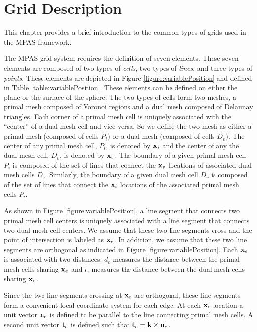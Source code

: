 \chapter{Grid Description}

This chapter provides a brief introduction to the common types of grids used in the MPAS framework. 

The MPAS grid system requires the definition of seven elements. These seven elements are composed of two types of {\it cells}, two types of {\it lines}, and three types of {\it points}. These elements are depicted in Figure \ref{figure:variablePosition} and defined in Table \ref{table:variablePosition}.  These elements can be defined on either the plane or the surface of the sphere. The two types of cells form two meshes, a primal mesh composed of Voronoi regions and a dual mesh composed of Delaunay triangles. Each corner of a primal mesh cell is uniquely associated with the ``center'' of a dual mesh cell and vice versa. So we define the two mesh as either a primal mesh (composed of cells $P_i$) or a dual mesh (composed of cells $D_v$). The center of any primal mesh cell, $P_i$, is denoted by ${\bf x}_i$ and the center of any the dual mesh cell, $D_v$, is denoted by ${\bf x}_v$. The boundary of a given primal mesh cell $P_i$ is composed of the set of lines that connect the ${\bf x}_v$ locations of associated dual mesh cells $D_v$. Similarly, the boundary of a given dual mesh cell $D_v$ is composed of the set of lines that connect the ${\bf x}_i$ locations of the associated primal mesh cells $P_i$. 

As shown in Figure \ref{figure:variablePosition}, a line segment that connects two primal mesh cell centers is uniquely associated with a line segment that connects two dual mesh cell centers. We assume that these two line segments cross and the point of intersection is labeled as ${\bf x}_e$. In addition, we assume that these two line segments are orthogonal as indicated in Figure \ref{figure:variablePosition}. Each ${\bf x}_e$ is associated with two distances: $d_e$ measures the distance between the primal mesh cells sharing ${\bf x}_e$ and $l_e$ measures the distance between the dual mesh cells sharing ${\bf x}_e$.

Since the two line segments crossing at ${\bf x}_e$ are orthogonal, these line segments form a convenient local coordinate system for each edge. At each ${\bf x}_e$ location a unit vector ${\bf n}_e$ is defined to be parallel to the line connecting primal mesh cells. A second unit vector ${\bf t}_e$ is defined such that ${\bf t}_e = {\bf k} \times {\bf n}_e$.

